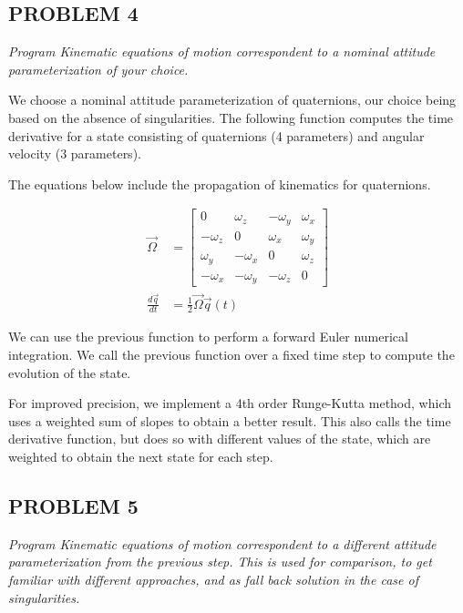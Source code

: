 \subsection{PROBLEM 4}
\textit{Program Kinematic equations of motion correspondent to a nominal attitude parameterization of your choice.}

We choose a nominal attitude parameterization of quaternions, our choice being based on the absence of singularities. The following function computes the time derivative for a state consisting of quaternions (4 parameters) and angular velocity (3 parameters).

The equations below include the propagation of kinematics for quaternions.

\begin{align*}
\Vec{\Omega} &= 
    \begin{bmatrix}
    0 & \omega_{z} & -\omega_{y} & \omega_{x}\\
    -\omega_{z} & 0 & \omega_{x} & \omega_{y}\\
    \omega_{y} & -\omega_{x} & 0 & \omega_{z}\\
    -\omega_{x} & -\omega_{y} & -\omega_{z} & 0
    \end{bmatrix}\\
\frac{d \Vec{q}}{dt} &= \frac{1}{2} \Vec{\Omega} \Vec{q}(t)
\end{align*}



We can use the previous function to perform a forward Euler numerical integration. We call the previous function over a fixed time step to compute the evolution of the state.



For improved precision, we implement a 4th order Runge-Kutta method, which uses a weighted sum of slopes to obtain a better result. This also calls the time derivative function, but does so with different values of the state, which are weighted to obtain the next state for each step.




\subsection{PROBLEM 5}
\textit{Program Kinematic equations of motion correspondent to a different attitude parameterization from the previous step. This is used for comparison, to get familiar with different approaches, and as fall back solution in the case of singularities.}

